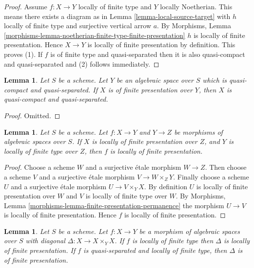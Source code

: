 \documentclass{stacks-project}
\theoremstyle{plain}
\newtheorem{lemma}[subsection]{Lemma}
\theoremstyle{definition}
\theoremstyle{remark}
\numberwithin{equation}{subsection}
\begin{document}
\begin{proof}
Assume $f : X \to Y$ locally of finite type and $Y$ locally Noetherian.
This means there exists a diagram as in
Lemma \ref{lemma-local-source-target}
with $h$ locally of finite type and surjective vertical arrow $a$. By
Morphisms, Lemma
\ref{morphisms-lemma-noetherian-finite-type-finite-presentation}
$h$ is locally of finite presentation.
Hence $X \to Y$ is locally of finite presentation by definition.
This proves (1).
If $f$ is of finite type and quasi-separated then it is also
quasi-compact and quasi-separated and (2) follows immediately.
\end{proof}

\begin{lemma}
\label{lemma-finite-presentation-quasi-compact-quasi-separated}
Let $S$ be a scheme. Let $Y$ be an algebraic space over $S$ which is
quasi-compact and quasi-separated. If $X$ is of finite presentation over
$Y$, then $X$ is quasi-compact and quasi-separated.
\end{lemma}

\begin{proof}
Omitted.
\end{proof}

\begin{lemma}
\label{lemma-finite-presentation-permanence}
Let $S$ be a scheme.
Let $f : X \to Y$ and $Y \to Z$ be morphisms of algebraic spaces over $S$.
If $X$ is locally of finite presentation over $Z$, and
$Y$ is locally of finite type over $Z$, then $f$ is locally
of finite presentation.
\end{lemma}

\begin{proof}
Choose a scheme $W$ and a surjective \'etale morphism $W \to Z$.
Then choose a scheme $V$ and a surjective \'etale morphism $V \to W \times_Z Y$.
Finally choose a scheme $U$ and a surjective \'etale morphism
$U \to V \times_Y X$. By definition $U$ is locally of finite presentation
over $W$ and $V$ is locally of finite type over $W$. By
Morphisms, Lemma \ref{morphisms-lemma-finite-presentation-permanence}
the morphism $U \to V$ is locally of finite presentation.
Hence $f$ is locally of finite presentation.
\end{proof}

\begin{lemma}
\label{lemma-diagonal-morphism-finite-type}
Let $S$ be a scheme. Let $f : X \to Y$ be a morphism of algebraic spaces
over $S$ with diagonal $\Delta : X \to X \times_Y X$. If $f$ is locally of
finite type then $\Delta$ is locally of finite presentation. If $f$ is
quasi-separated and locally of finite type, then $\Delta$ is of finite
presentation.
\end{lemma}
\end{document}
